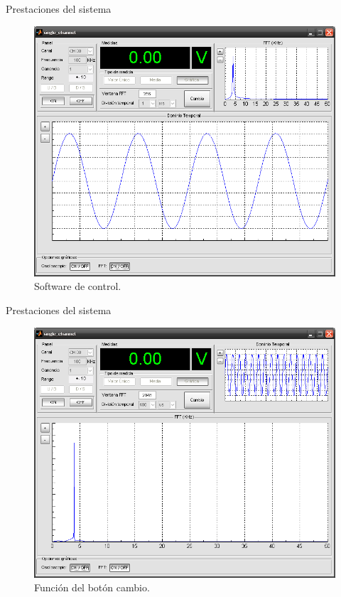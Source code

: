 \documentclass[utf8, compress]			{beamer}
\begin{document}
\begin{frame}{Prestaciones del sistema}
    \begin{figure}
	\includegraphics{software.png}
	\caption{Software de control.}
	\label{fig:software}
    \end{figure}
\end{frame}

\begin{frame}{Prestaciones del sistema}
    \begin{figure}
	\includegraphics{softwarebis.png}
	\caption{Función del botón cambio.}
	\label{fig:softwarebis}
    \end{figure}
\end{frame}
\end{document}
